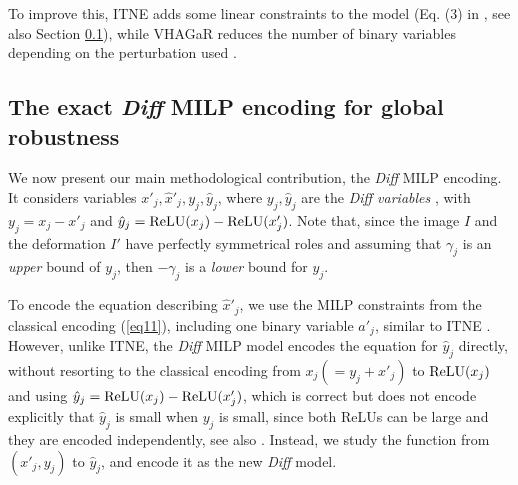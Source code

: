 	To improve this, ITNE adds some linear constraints to the model (Eq. (3) in \cite{ITNE}, see also Section \ref{s.diff}), while VHAGaR reduces the number of binary variables depending on the perturbation used \cite{vhagar}.
	
	


	
	
	


	

\fi
	
\subsection{The exact {\em Diff} MILP encoding for global robustness}
	\label{s.diff}

We now present our main methodological contribution, the {\em Diff} MILP encoding. It considers variables $x'_j,\hat{x}'_j, y_j, \hat{y}_j$, where $y_j, \hat{y}_j$ are the {\em Diff variables} \cite{diff}, with 
	$y_j = x_j - x'_j$ and $\hat{y}_j= \mathrm{ReLU}({x}_j) - \mathrm{ReLU}(x'_j)$. 
	Note that, since the image $I$ and the deformation $I'$ have perfectly symmetrical roles and assuming that $\gamma_j$ is an {\em upper} bound of $y_j$, then $-\gamma_j$ is a {\em lower} bound for $y_j$.


	To encode the equation describing $\hat{x}'_j$, we use 
	the MILP constraints from the classical encoding (\ref{eq11}), including
	one binary variable $a'_j$, similar to ITNE \cite{ITNE}.
    However, unlike ITNE, 
	the {\em Diff} MILP model encodes the equation for $\hat{y}_j$ directly, without resorting to the classical encoding from $x_j(=y_j+x'_j)$ to 
	$\mathrm{ReLU}(x_j)$ and using $\hat{y}_j= \mathrm{ReLU}(x_j) - \mathrm{ReLU}(x'_j)$, which is correct but does not encode explicitly that $\hat{y}_j$ is small when $y_j$ is small, since both ReLUs can be large and they are encoded independently, see also \cite{diff}. Instead, we study the function from $(x'_j,y_j)$ to $\hat{y}_j$, and encode it as the new %
	{\em Diff} model.
    


